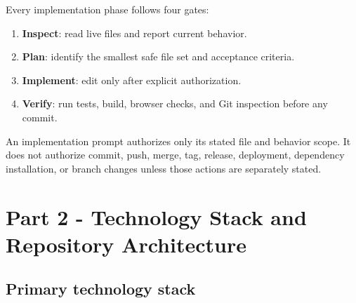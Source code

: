 \documentclass[11pt,letterpaper]{article}
\begin{document}
Every implementation phase follows four gates:

\begin{enumerate}
    \item \textbf{Inspect}: read live files and report current behavior.
    \item \textbf{Plan}: identify the smallest safe file set and acceptance
          criteria.
    \item \textbf{Implement}: edit only after explicit authorization.
    \item \textbf{Verify}: run tests, build, browser checks, and Git inspection
          before any commit.
\end{enumerate}

\begin{safetybox}
An implementation prompt authorizes only its stated file and behavior scope. It
does not authorize commit, push, merge, tag, release, deployment, dependency
installation, or branch changes unless those actions are separately stated.
\end{safetybox}

\section{Part 2 - Technology Stack and Repository Architecture}

\subsection{Primary technology stack}
\end{document}
